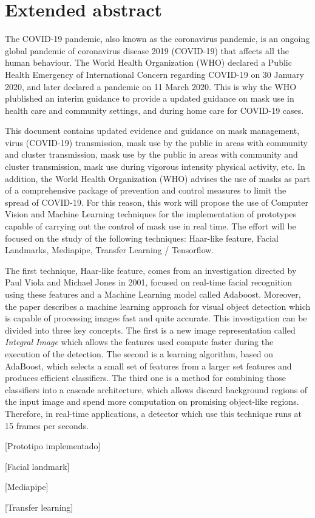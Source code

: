 
\chapter*{Extended abstract}

The COVID-19 pandemic, also known as the coronavirus pandemic, is an ongoing global pandemic of coronavirus disease 2019 (COVID-19) that affects all the human behaviour. The World Health Organization (WHO) declared a Public Health Emergency of International Concern regarding COVID-19 on 30 January 2020, and later declared a pandemic on 11 March 2020. This is why the WHO plublished an interim guidance to provide a updated guidance on mask use in health care and community settings, and during home care for COVID-19 cases.

This document contains updated evidence and guidance on mask management, virus (COVID-19) transmission, mask use by the public in areas with community and cluster transmission, mask use by the public in areas with community and cluster transmission, mask use during vigorous intensity physical activity, etc. In addition, the World Health Organization (WHO) advises the use of masks as part of a comprehensive package of prevention and control measures to limit the spread of COVID-19. For this reason, this work will propose the use of Computer Vision and Machine Learning techniques for the implementation of prototypes capable of carrying out the control of mask use in real time. The effort will be focused on the study of the following techniques: Haar-like feature, Facial Landmarks, Mediapipe, Transfer Learning / Tensorflow.

The first technique, Haar-like feature, comes  from an investigation directed by Paul Viola and Michael Jones in 2001, focused on real-time facial recognition using these features and a Machine Learning model called Adaboost. Moreover, the paper describes a machine learning approach for visual object detection which is capable of processing images fast and quite accurate. This investigation can be divided into three key concepts. The first is a new image representation called \textit{Integral Image} which allows the features used compute faster during the execution of the detection. The second is a learning algorithm, based on AdaBoost, which selects a small set of features from a larger set features and produces efficient classifiers. The third one is a method for combining those classifiers into a cascade architecture, which allows discard background regions of the input image and spend more computation on promising object-like regions. Therefore, in real-time applications, a detector which use this technique runs at 15 frames per seconds.

[Prototipo implementado]

[Facial landmark]

[Mediapipe]

[Transfer learning]
